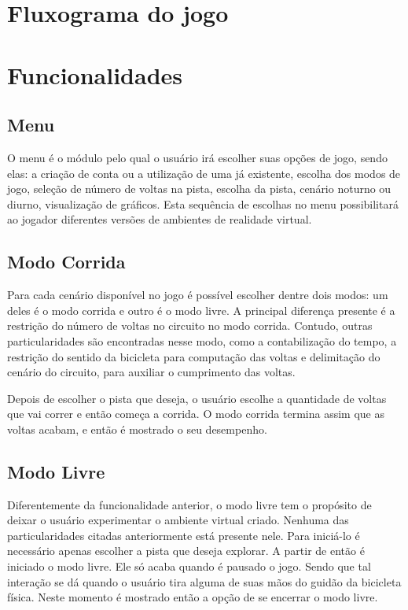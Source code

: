 \section{Fluxograma do jogo}

\section{Funcionalidades}
\subsection{Menu}
O menu é o módulo pelo qual o usuário irá escolher suas opções de jogo, sendo elas: a criação de conta ou a utilização de uma já existente, escolha dos modos de jogo, seleção de número de voltas na pista, escolha da pista, cenário noturno ou diurno, visualização de gráficos. Esta sequência de escolhas no menu possibilitará ao jogador diferentes versões de ambientes de realidade virtual.

\subsection{Modo Corrida}
\label{corrida}

Para cada cenário disponível no jogo é possível escolher dentre dois modos: um deles é o modo corrida e outro é o modo livre. A principal diferença presente é a restrição do número de voltas no circuito no modo corrida. Contudo, outras particularidades são encontradas nesse modo, como a contabilização do tempo, a restrição do sentido da bicicleta para computação das voltas e delimitação do cenário do circuito, para auxiliar o cumprimento das voltas.

Depois de escolher o pista que deseja, o usuário escolhe a quantidade de voltas que vai correr e então começa a corrida. O modo corrida termina assim que as voltas acabam, e então é mostrado o seu desempenho.

\subsection{Modo Livre}
\label{livre}
Diferentemente da funcionalidade anterior, o modo livre tem o propósito de deixar o usuário experimentar o ambiente virtual criado. Nenhuma das particularidades citadas anteriormente está presente nele. Para iniciá-lo é necessário apenas escolher a pista que deseja explorar. A partir de então é iniciado o modo livre. Ele só acaba quando é pausado o jogo. Sendo que tal interação se dá quando o usuário tira alguma de suas mãos do guidão da bicicleta física. Neste momento é mostrado então a opção de se encerrar o modo livre.

